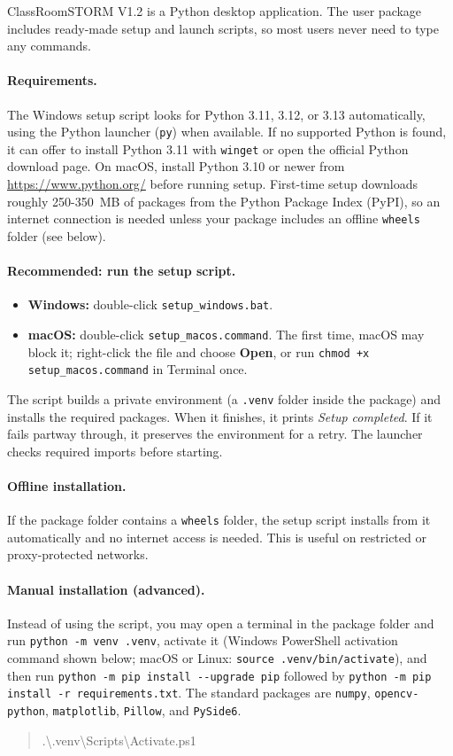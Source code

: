 \documentclass[11pt,a4paper]{article}
\newcommand{\ui}[1]{\textbf{#1}}
\newcommand{\file}[1]{\texttt{#1}}
\newcommand{\app}{ClassRoomSTORM}
\begin{document}
\app{} V1.2 is a Python desktop application. The user package includes ready-made
setup and launch scripts, so most users never need to type any commands.

\paragraph{Requirements.} The Windows setup script looks for Python 3.11, 3.12,
or 3.13 automatically, using the Python launcher (\file{py}) when available. If
no supported Python is found, it can offer to install Python 3.11 with
\file{winget} or open the official Python download page. On macOS, install
Python 3.10 or newer from \url{https://www.python.org/} before running setup.
First-time setup downloads roughly 250-350~MB of packages from the Python
Package Index (PyPI), so an internet connection is needed unless your package
includes an offline \file{wheels} folder (see below).

\paragraph{Recommended: run the setup script.}
\begin{itemize}
  \item \textbf{Windows:} double-click \file{setup\_windows.bat}.
  \item \textbf{macOS:} double-click \file{setup\_macos.command}. The first time,
        macOS may block it; right-click the file and choose \ui{Open}, or run
        \file{chmod +x setup\_macos.command} in Terminal once.
\end{itemize}
The script builds a private environment (a \file{.venv} folder inside the package)
and installs the required packages. When it finishes, it prints
\emph{Setup completed}. If it fails partway through, it preserves the environment for a
retry. The launcher checks required imports before starting.

\paragraph{Offline installation.} If the package folder contains a \file{wheels}
folder, the setup script installs from it automatically and no internet access is
needed. This is useful on restricted or proxy-protected networks.

\paragraph{Manual installation (advanced).} Instead of using the script, you may open a
terminal in the package folder and run \file{python -m venv .venv}, activate it
(Windows PowerShell activation command shown below;
macOS or Linux: \file{source .venv/bin/activate}), and then run
\file{python -m pip install -{}-upgrade pip} followed by
\file{python -m pip install -r requirements.txt}. The standard packages are
\file{numpy}, \file{opencv-python}, \file{matplotlib}, \file{Pillow}, and
\file{PySide6}.
\begin{quote}\small\ttfamily
.{\textbackslash}.venv{\textbackslash}Scripts{\textbackslash}Activate.ps1
\end{quote}
\end{document}

